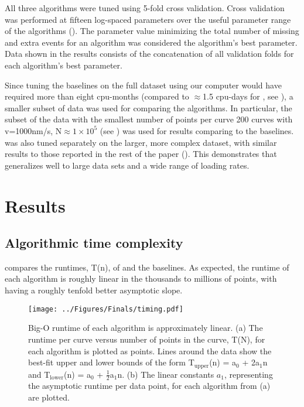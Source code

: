 \firstp All three algorithms were tuned using 5-fold cross validation. Cross validation was performed at fifteen log-spaced parameters over the useful parameter range of the algorithms (). The parameter value minimizing the total number of missing and extra events for an algorithm was considered the algorithm's best parameter. Data shown in the results consists of the concatenation of all validation folds for each algorithm's best parameter. \pl

Since tuning the baselines on the full dataset using our computer would have required more than eight cpu-months (compared to $\approx$1.5 cpu-days for \name{}, see ), a smaller subset of data was used for comparing the algorithms. In particular, the subset of the data with the smallest number of points per curve \textemdash{} 200 curves with v=1000nm/s, N$\approx1\times10^{5}$ (see ) \textemdash{} was used for results comparing \name{} to the baselines. \name{} was also tuned separately on the larger, more complex dataset, with similar results to those reported in the rest of the paper (). This demonstrates that \name{} generalizes well to large data sets and a wide range of loading rates. 

\section{Results}

\subsection{Algorithmic time complexity}

\firstp {} compares the runtimes, T(n), of \name{} and the baselines. As expected, the runtime of each algorithm is roughly linear in the thousands to millions of points, with \name{} having a roughly tenfold better asymptotic slope.  \pl

\begin{figure}
\centering
\texttt{[image: ../Figures/Finals/timing.pdf]}%
\caption[Runtime versus length of curve]{\noindent{}\pStartF  Big-O runtime of each algorithm is approximately linear. (a) The runtime per curve versus number of points in the curve, T(N), for each algorithm is plotted as points. Lines around the data show the best-fit upper and lower bounds of the form T$_{\mathrm{upper}}$(n) = a$_0$ + 2a$_1$n  and T$_{\mathrm{lower}}$(n) = a$_0$ + $\frac{1}{2}$a$_1$n. (b) The linear constants $a_1$, representing the asymptotic runtime per data point, for each algorithm from (a) are plotted. \pEndF}
\end{figure}

